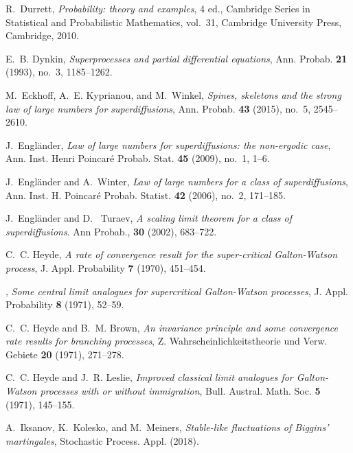 \documentclass[12pt,a4paper]{amsart}
\theoremstyle{plain}
\theoremstyle{definition}
\numberwithin{equation}{section}
\begin{document}
\begin{thebibliography}{10}
R.~Durrett, \emph{Probability: theory and examples}, 4 ed., Cambridge Series in
  Statistical and Probabilistic Mathematics, vol.~31, Cambridge University
  Press, Cambridge, 2010.

E.~B. Dynkin, \emph{Superprocesses and partial differential equations}, Ann.
  Probab. \textbf{21} (1993), no.~3, 1185--1262.

M.~Eckhoff, A.~E. Kyprianou, and M.~Winkel, \emph{Spines, skeletons and the
  strong law of large numbers for superdiffusions}, Ann. Probab. \textbf{43}
  (2015), no.~5, 2545--2610.

J.~Engl\"{a}nder, \emph{Law of large numbers for superdiffusions: the
  non-ergodic case}, Ann. Inst. Henri Poincar\'{e} Probab. Stat. \textbf{45}
  (2009), no.~1, 1--6.


J.~Engl\"{a}nder and A.~Winter, \emph{Law of large numbers for a class of
  superdiffusions}, Ann. Inst. H. Poincar\'{e} Probab. Statist. \textbf{42}
  (2006), no.~2, 171--185.

J.~Engl\"{a}nder and  D. ~Turaev, \emph{A scaling limit theorem for a class of superdiffusions}. Ann Probab., \textbf{30} (2002),  683--722.


C.~C. Heyde, \emph{A rate of convergence result for the super-critical
  {G}alton-{W}atson process}, J. Appl. Probability \textbf{7} (1970), 451--454.

\bysame, \emph{Some central limit analogues for supercritical {G}alton-{W}atson
  processes}, J. Appl. Probability \textbf{8} (1971), 52--59.

C.~C. Heyde and B.~M. Brown, \emph{An invariance principle and some convergence
  rate results for branching processes}, Z. Wahrscheinlichkeitstheorie und
  Verw. Gebiete \textbf{20} (1971), 271--278.

C.~C. Heyde and J.~R. Leslie, \emph{Improved classical limit analogues for
  {G}alton-{W}atson processes with or without immigration}, Bull. Austral.
  Math. Soc. \textbf{5} (1971), 145--155.



A.~Iksanov, K.~Kolesko, and M.~Meiners, \emph{Stable-like fluctuations of {B}iggins' martingales}, Stochastic
  Process. Appl. (2018).


\end{thebibliography}
\end{document}
